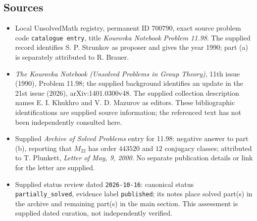 \documentclass[11pt]{article}
\begin{document}
\subsection{Sources}
\begin{itemize}
\item Local UnsolvedMath registry, permanent ID \(700790\), exact source problem code \texttt{catalogue entry}, title \emph{Kourovka Notebook Problem 11.98}. The supplied record identifies S. P. Strunkov as proposer and gives the year 1990; part (a) is separately attributed to R. Brauer.
\item \emph{The Kourovka Notebook (Unsolved Problems in Group Theory)}, 11th issue (1990), Problem 11.98; the supplied background identifies an update in the 21st issue (2026), arXiv:1401.0300v48. The supplied collection description names E. I. Khukhro and V. D. Mazurov as editors. These bibliographic identifications are supplied source information; the referenced text has not been independently consulted here.
\item Supplied \emph{Archive of Solved Problems} entry for 11.98: negative answer to part (b), reporting that \(M_{22}\) has order \(443520\) and \(12\) conjugacy classes; attributed to T. Plunkett, \emph{Letter of May, 9, 2000}. No separate publication details or link for the letter are supplied.
\item Supplied status review dated \texttt{2026-10-16}: canonical status \texttt{partially\_solved}, evidence label \texttt{published}; its notes place solved part(s) in the archive and remaining part(s) in the main section. This assessment is supplied dated curation, not independently verified.
\end{itemize}
\end{document}
